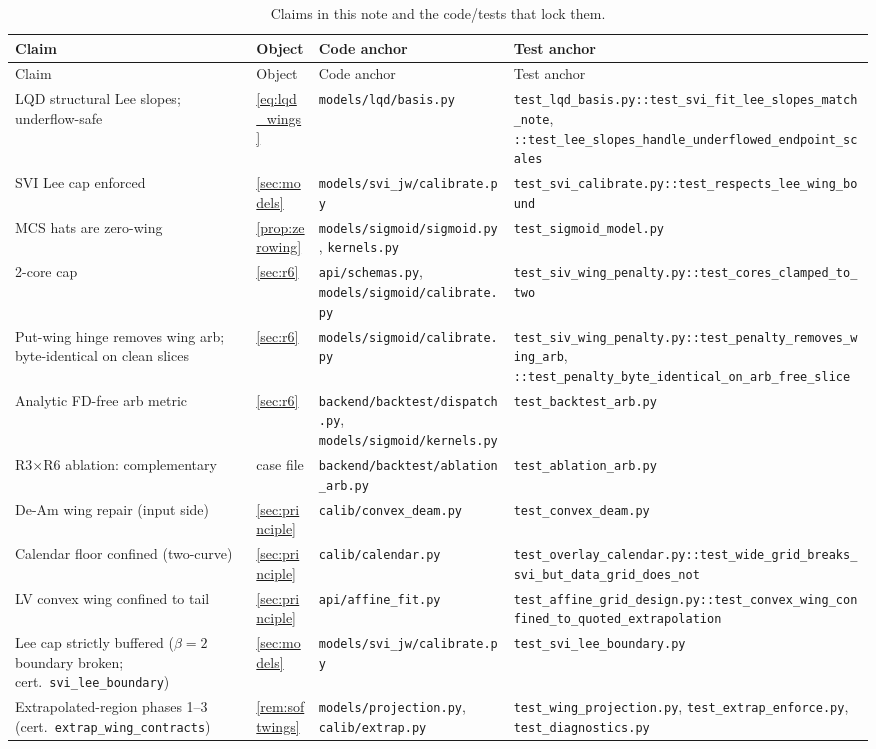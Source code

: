 \documentclass[11pt]{article}
\begin{document}
\begingroup
\small
\setlength{\tabcolsep}{3pt}
\begin{longtable}{@{}p{}p{}p{}p{}@{}}
\caption{Claims in this note and the code/tests that lock them.}\\
\toprule Claim & Object & Code anchor & Test anchor\\ \midrule
\endfirsthead
\toprule Claim & Object & Code anchor & Test anchor\\ \midrule
\endhead
LQD structural Lee slopes; underflow-safe &
\eqref{eq:lqd_wings} &
\nolinkurl{models/lqd/basis.py} &
\nolinkurl{test_lqd_basis.py::test_svi_fit_lee_slopes_match_note}, \nolinkurl{::test_lee_slopes_handle_underflowed_endpoint_scales}\\
SVI Lee cap enforced &
\cref{sec:models} &
\nolinkurl{models/svi_jw/calibrate.py} &
\nolinkurl{test_svi_calibrate.py::test_respects_lee_wing_bound}\\
MCS hats are zero-wing &
\cref{prop:zerowing} &
\nolinkurl{models/sigmoid/sigmoid.py}, \nolinkurl{kernels.py} &
\nolinkurl{test_sigmoid_model.py}\\
2-core cap &
\cref{sec:r6} &
\nolinkurl{api/schemas.py}, \nolinkurl{models/sigmoid/calibrate.py} &
\nolinkurl{test_siv_wing_penalty.py::test_cores_clamped_to_two}\\
Put-wing hinge removes wing arb; byte-identical on clean slices &
\cref{sec:r6} &
\nolinkurl{models/sigmoid/calibrate.py} &
\nolinkurl{test_siv_wing_penalty.py::test_penalty_removes_wing_arb}, \nolinkurl{::test_penalty_byte_identical_on_arb_free_slice}\\
Analytic FD-free arb metric &
\cref{sec:r6} &
\nolinkurl{backend/backtest/dispatch.py}, \nolinkurl{models/sigmoid/kernels.py} &
\nolinkurl{test_backtest_arb.py}\\
R3$\times$R6 ablation: complementary &
case file &
\nolinkurl{backend/backtest/ablation_arb.py} &
\nolinkurl{test_ablation_arb.py}\\
De-Am wing repair (input side) &
\cref{sec:principle} &
\nolinkurl{calib/convex_deam.py} &
\nolinkurl{test_convex_deam.py}\\
Calendar floor confined (two-curve) &
\cref{sec:principle} &
\nolinkurl{calib/calendar.py} &
\nolinkurl{test_overlay_calendar.py::test_wide_grid_breaks_svi_but_data_grid_does_not}\\
LV convex wing confined to tail &
\cref{sec:principle} &
\nolinkurl{api/affine_fit.py} &
\nolinkurl{test_affine_grid_design.py::test_convex_wing_confined_to_quoted_extrapolation}\\
\addlinespace
Lee cap strictly buffered ($\beta=2$ boundary broken; cert.\
\texttt{svi\_lee\_boundary}) &
\cref{sec:models} &
\nolinkurl{models/svi_jw/calibrate.py} &
\nolinkurl{test_svi_lee_boundary.py}\\
Extrapolated-region phases 1--3 (cert.\ \texttt{extrap\_wing\_contracts}) &
\cref{rem:softwings} &
\nolinkurl{models/projection.py}, \nolinkurl{calib/extrap.py} &
\nolinkurl{test_wing_projection.py}, \nolinkurl{test_extrap_enforce.py},
\nolinkurl{test_diagnostics.py}\\
\bottomrule
\end{longtable}
\endgroup
\end{document}
